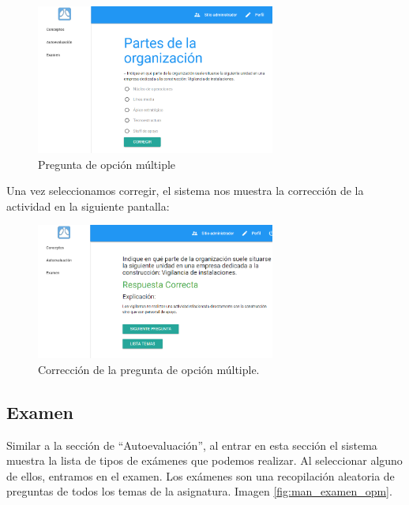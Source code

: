 \begin{figure}[!H]
 	\centering
 	\includegraphics[width=0.7\textwidth]{../images/manual/pregunta_opm.png}
    \caption{Pregunta de opción múltiple}
    \label{fig:man_pregunta_opm}
\end{figure}


\bigskip
Una vez seleccionamos corregir, el sistema nos muestra la corrección de la actividad en la siguiente pantalla: 


\begin{figure}[!H]
 	\centering
 	\includegraphics[width=0.7\textwidth]{../images/manual/pregunta_opm_respuesta.png}
    \caption{Corrección de la pregunta de opción múltiple.}
    \label{fig:man_pregunta_opm_respuesta}
\end{figure}







\newpage
\subsection{Examen}
\bigskip
Similar a la sección de ``Autoevaluación'', al entrar en esta sección el sistema muestra la lista de tipos de exámenes que podemos realizar. Al seleccionar alguno de ellos, entramos en el examen. Los exámenes son una recopilación aleatoria de preguntas de todos los temas de la asignatura. Imagen 
\ref{fig:man_examen_opm}.




